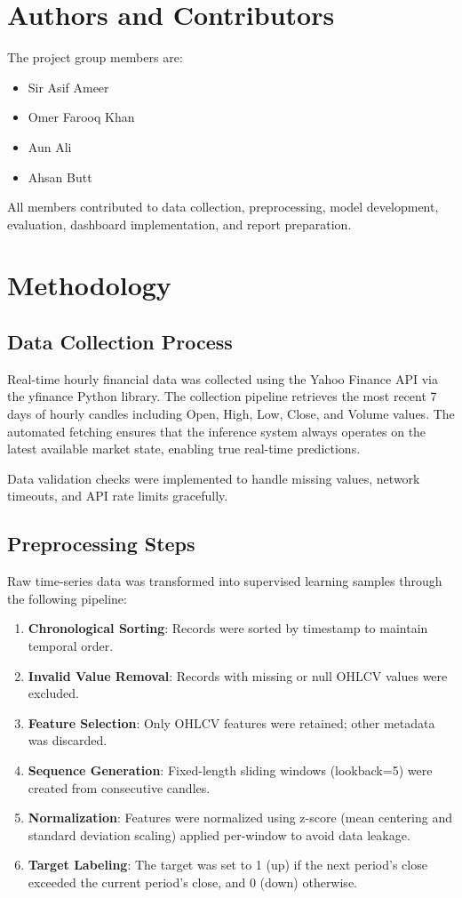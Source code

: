 \documentclass[conference]{IEEEtran}
\begin{document}
\section{Authors and Contributors}
The project group members are:
\begin{itemize}
    \item Sir Asif Ameer
    \item Omer Farooq Khan
    \item Aun Ali
    \item Ahsan Butt
\end{itemize}

All members contributed to data collection, preprocessing, model development, evaluation, dashboard implementation, and report preparation.

\section{Methodology}

\subsection{Data Collection Process}
Real-time hourly financial data was collected using the Yahoo Finance API via the yfinance Python library. The collection pipeline retrieves the most recent 7 days of hourly candles including Open, High, Low, Close, and Volume values. The automated fetching ensures that the inference system always operates on the latest available market state, enabling true real-time predictions.

Data validation checks were implemented to handle missing values, network timeouts, and API rate limits gracefully.

\subsection{Preprocessing Steps}
Raw time-series data was transformed into supervised learning samples through the following pipeline:

\begin{enumerate}
    \item \textbf{Chronological Sorting}: Records were sorted by timestamp to maintain temporal order.
    \item \textbf{Invalid Value Removal}: Records with missing or null OHLCV values were excluded.
    \item \textbf{Feature Selection}: Only OHLCV features were retained; other metadata was discarded.
    \item \textbf{Sequence Generation}: Fixed-length sliding windows (lookback=5) were created from consecutive candles.
    \item \textbf{Normalization}: Features were normalized using z-score (mean centering and standard deviation scaling) applied per-window to avoid data leakage.
    \item \textbf{Target Labeling}: The target was set to 1 (up) if the next period's close exceeded the current period's close, and 0 (down) otherwise.
\end{enumerate}
\end{document}
